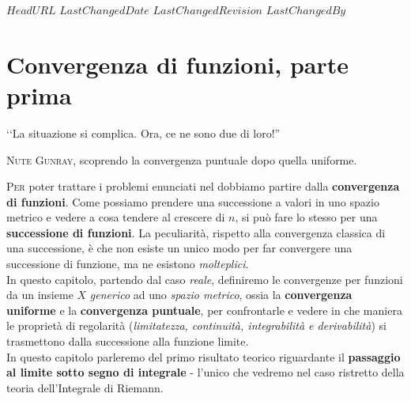\svnidlong
{$HeadURL$}
{$LastChangedDate$}
{$LastChangedRevision$}
{$LastChangedBy$}

\chapter{Convergenza di funzioni, parte prima}

\begin{introduction}
	‘‘La situazione si complica. Ora, ce ne sono due di loro!''
	\begin{flushright}
		\textsc{Nute Gunray,} scoprendo la convergenza puntuale dopo quella uniforme.
	\end{flushright}
\end{introduction}
\lettrine[findent=1pt, nindent=0pt]{P}{er} poter trattare i problemi enunciati nel  dobbiamo partire dalla \textbf{convergenza di funzioni}. Come possiamo prendere una successione a valori in uno spazio metrico e vedere a cosa tendere al crescere di $n$, si può fare lo stesso per una \textbf{successione di funzioni}. La peculiarità, rispetto alla convergenza classica di una successione, è che non esiste un unico modo per far convergere una successione di funzione, ma ne esistono \textit{molteplici}.\\
In questo capitolo, partendo dal caso \textit{reale}, definiremo le convergenze per funzioni da un insieme $X$ \textit{generico} ad uno \textit{spazio metrico}, ossia la \textbf{convergenza uniforme} e la \textbf{convergenza puntuale}, per confrontarle e vedere in che maniera le proprietà di regolarità (\textit{limitatezza, continuità, integrabilità e derivabilità}) si trasmettono dalla successione alla funzione limite.\\
In questo capitolo parleremo del primo risultato teorico riguardante il \textbf{passaggio al limite sotto segno di integrale} - l'unico che vedremo nel caso ristretto della teoria dell'Integrale di Riemann.
